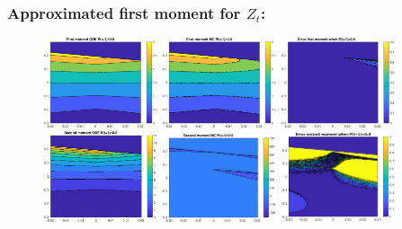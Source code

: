 \documentclass[aspectratio=169]{beamer}\usepackage[utf8]{inputenc}
\begin{document}
\begin{frame}\frametitle{Approximated first moment for $Z_t$:}

\begin{figure}[ht!]
\centering
\includegraphics[width=0.3\textwidth]{../../MATLAB_Files/Results/moments/lamperti/errors/fm_ODE_7.eps}\quad
\includegraphics[width=0.3\textwidth]{../../MATLAB_Files/Results/moments/lamperti/errors/fm_MC_7.eps}\quad
\includegraphics[width=0.3\textwidth]{../../MATLAB_Files/Results/moments/lamperti/errors/fm_7.eps}\quad
\includegraphics[width=0.3\textwidth]{../../MATLAB_Files/Results/moments/lamperti/errors/sm_ODE_7.eps}\quad
\includegraphics[width=0.3\textwidth]{../../MATLAB_Files/Results/moments/lamperti/errors/sm_MC_7.eps}\quad
\includegraphics[width=0.3\textwidth]{../../MATLAB_Files/Results/moments/lamperti/errors/sm_7.eps}
\end{figure}

\end{frame}
\end{document}
